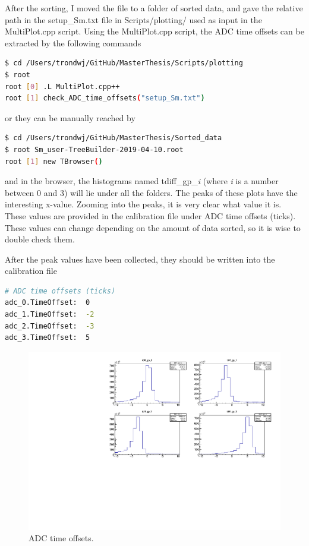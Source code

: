 \documentclass[twoside,english]{uiofysmaster/uiofysmaster}
\begin{document}
After the sorting, I moved the file to a folder of sorted data, and gave the relative path in the setup\_Sm.txt file in Scripts/plotting/ used as input in the MultiPlot.cpp script. 
Using the MultiPlot.cpp script, the ADC time offsets can be extracted by the following commands
\begin{lstlisting}[language=sh]
$ cd /Users/trondwj/GitHub/MasterThesis/Scripts/plotting
$ root
root [0] .L MultiPlot.cpp++
root [1] check_ADC_time_offsets("setup_Sm.txt")
\end{lstlisting}
or they can be manually reached by
\begin{lstlisting}[language=sh]
$ cd /Users/trondwj/GitHub/MasterThesis/Sorted_data
$ root Sm_user-TreeBuilder-2019-04-10.root
root [1] new TBrowser()
\end{lstlisting}
and in the browser, the histograms named tdiff\_gp\_\textit{i} (where \textit{i} is a number between 0 and 3) will lie under all the folders. The peaks of these plots have the interesting x-value. Zooming into the peaks, it is very clear what value it is. These values are provided in the calibration file under ADC time offsets (ticks). These values can change depending on the amount of data sorted, so it is wise to double check them.

After the peak values have been collected, they should be written into the calibration file
\begin{lstlisting}[language=sh]
# ADC time offsets (ticks)
adc_0.TimeOffset:  0
adc_1.TimeOffset:  -2
adc_2.TimeOffset:  -3
adc_3.TimeOffset:  5
\end{lstlisting}

\begin{figure}[ht]
	\centering
	\includegraphics[width=\textwidth]{../Plots/plotting/tdiff_gp_0-3-user.pdf}
	\caption{ADC time offsets.}
	\label{fig:ADC_dt}
\end{figure}
\end{document}
